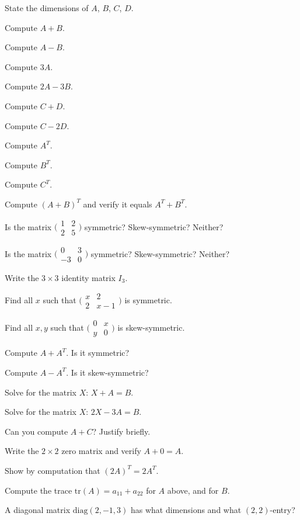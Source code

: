 \begin{problems}
  \item State the dimensions of $A$, $B$, $C$, $D$.
  \item Compute $A + B$.
  \item Compute $A - B$.
  \item Compute $3 A$.
  \item Compute $2 A - 3 B$.
  \item Compute $C + D$.
  \item Compute $C - 2 D$.
  \item Compute $A^{T}$.
  \item Compute $B^{T}$.
  \item Compute $C^{T}$.
  \item Compute $(A + B)^{T}$ and verify it equals $A^{T} + B^{T}$.
  \item Is the matrix $\bigl(\begin{smallmatrix} 1 & 2 \\ 2 & 5 \end{smallmatrix}\bigr)$ symmetric? Skew-symmetric? Neither?
  \item Is the matrix $\bigl(\begin{smallmatrix} 0 & 3 \\ -3 & 0 \end{smallmatrix}\bigr)$ symmetric? Skew-symmetric? Neither?
  \item Write the $3 \times 3$ identity matrix $I_{3}$.
  \item Find all $x$ such that $\bigl(\begin{smallmatrix} x & 2 \\ 2 & x-1 \end{smallmatrix}\bigr)$ is symmetric.
  \item Find all $x, y$ such that $\bigl(\begin{smallmatrix} 0 & x \\ y & 0 \end{smallmatrix}\bigr)$ is skew-symmetric.
  \item Compute $A + A^{T}$. Is it symmetric?
  \item Compute $A - A^{T}$. Is it skew-symmetric?
  \item Solve for the matrix $X$: $X + A = B$.
  \item Solve for the matrix $X$: $2 X - 3 A = B$.
  \item Can you compute $A + C$? Justify briefly.
  \item Write the $2 \times 2$ zero matrix and verify $A + 0 = A$.
  \item Show by computation that $(2 A)^{T} = 2 A^{T}$.
  \item Compute the trace $\mathrm{tr}(A) = a_{11} + a_{22}$ for $A$ above, and for $B$.
  \item A diagonal matrix $\mathrm{diag}(2, -1, 3)$ has what dimensions and what $(2,2)$-entry?
\end{problems}

